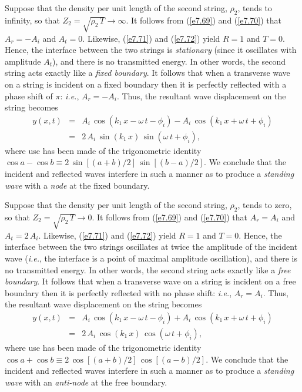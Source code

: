 Suppose that the density per unit length of the second string, $\rho_2$,  tends to infinity, so that
$Z_2=\sqrt{\rho_2\,T}\rightarrow\infty$. It follows from (\ref{e7.69}) and
(\ref{e7.70}) that $A_r=-A_i$ and $A_t=0$. Likewise, (\ref{e7.71}) and (\ref{e7.72}) yield $R=1$ and $T=0$. Hence, the interface between the
two strings is {\em stationary}\/ (since it oscillates with amplitude $A_t$), and there is no transmitted energy. In
other words, the second string acts exactly like a {\em fixed boundary}. It follows that
when a transverse wave on a string is incident on a fixed boundary then it is
perfectly reflected with a  phase shift of $\pi$: {\em i.e.}, $A_r=-A_i$. 
Thus, the resultant wave displacement on the string becomes
\begin{eqnarray}
y(x,t) &=& A_i\,\cos(k_1\,x-\omega\,t-\phi_i) -A_i\,\cos(k_1\,x+\omega\,t+\phi_i)\nonumber\\[0.5ex]
&=&2\,A_i\,\sin(k_1\,x)\,\sin(\omega\,t+\phi_i),
\end{eqnarray}
where use has been made of the trigonometric identity $\cos a-\cos b \equiv 2\,\sin[(a+b)/2]\,\sin[(b-a)/2]$. We conclude that the incident and reflected waves interfere in such
a manner as to produce a {\em standing wave}\/ with a {\em node}\/ at the fixed boundary.

Suppose that the density per unit length of the second string, $\rho_2$,  tends to zero, so that
$Z_2=\sqrt{\rho_2\,T}\rightarrow 0$. It follows from (\ref{e7.69}) and
(\ref{e7.70}) that $A_r=A_i$ and $A_t=2\,A_i$. Likewise, (\ref{e7.71}) and (\ref{e7.72}) yield $R=1$ and $T=0$. Hence, the interface between the
two strings oscillates at twice the amplitude of the incident wave ({\em i.e.}, the
interface is a point of maximal amplitude oscillation), and there is no transmitted energy. In
other words, the second string acts exactly like a {\em free boundary}. It follows that
when a transverse wave on a string is incident on a free boundary then it is
perfectly reflected with no phase shift: {\em i.e.}, $A_r=A_i$. 
Thus, the resultant wave displacement on the string becomes
\begin{eqnarray}
y(x,t) &=& A_i\,\cos(k_1\,x-\omega\,t-\phi_i) +A_i\,\cos(k_1\,x+\omega\,t+\phi_i)\nonumber\\[0.5ex]
&=&2\,A_i\,\cos(k_1\,x)\,\cos(\omega\,t+\phi_i),
\end{eqnarray}
where use has been made of the trigonometric identity $\cos a+\cos b\equiv 2\,\cos[(a+b)/2]\,\cos[(a-b)/2]$. We conclude that the incident and reflected waves interfere in such
a manner as to produce a {\em standing wave}\/ with an {\em anti-node}\/ at the free boundary.

